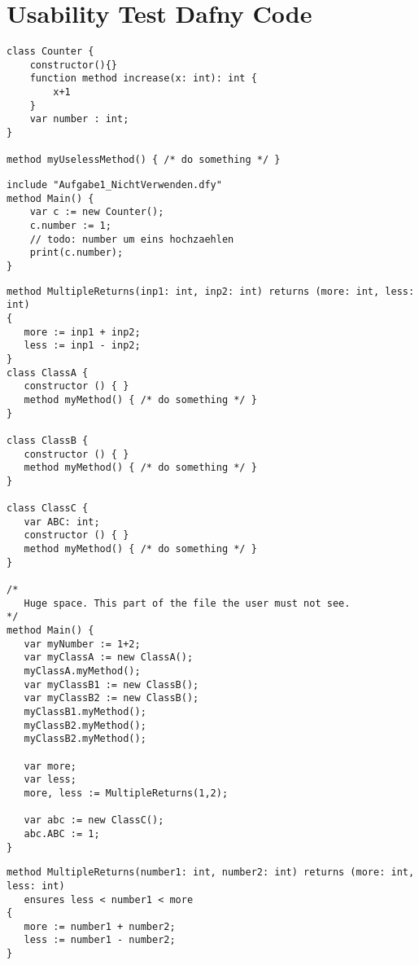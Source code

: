 \section*{Usability Test Dafny Code}

\begin{lstlisting}[language=dafny, caption={Aufgabe1\_NichtVerwenden.dfy}, captionpos=b, label={lst:Aufgabe1NichtVerwenden}]
class Counter {
    constructor(){}
    function method increase(x: int): int {
        x+1
    }
    var number : int;
}

method myUselessMethod() { /* do something */ }
\end{lstlisting}

\begin{lstlisting}[language=dafny, caption={Aufgabe1\_Verwenden.dfy}, captionpos=b, label={lst:Aufgabe1Verwenden}]
include "Aufgabe1_NichtVerwenden.dfy"
method Main() {
    var c := new Counter();
    c.number := 1;
    // todo: number um eins hochzaehlen
    print(c.number);
}
\end{lstlisting}

\begin{lstlisting}[language=dafny, caption={Aufgabe2.dfy}, captionpos=b, label={lst:Aufgabe2}]
method MultipleReturns(inp1: int, inp2: int) returns (more: int, less: int)
{
   more := inp1 + inp2;
   less := inp1 - inp2;
}
class ClassA {
   constructor () { }
   method myMethod() { /* do something */ }
}

class ClassB {
   constructor () { }
   method myMethod() { /* do something */ }
}

class ClassC {
   var ABC: int;
   constructor () { }
   method myMethod() { /* do something */ }
}

/*
   Huge space. This part of the file the user must not see.
*/
method Main() {
   var myNumber := 1+2;
   var myClassA := new ClassA();
   myClassA.myMethod();
   var myClassB1 := new ClassB();
   var myClassB2 := new ClassB();
   myClassB1.myMethod();
   myClassB2.myMethod();
   myClassB2.myMethod();

   var more;
   var less;
   more, less := MultipleReturns(1,2);

   var abc := new ClassC();
   abc.ABC := 1;
}
\end{lstlisting}

\begin{lstlisting}[language=dafny, caption={Aufgabe3.dfy}, captionpos=b, label={lst:Aufgabe3}]
method MultipleReturns(number1: int, number2: int) returns (more: int, less: int)
   ensures less < number1 < more
{
   more := number1 + number2;
   less := number1 - number2;
}
\end{lstlisting}
